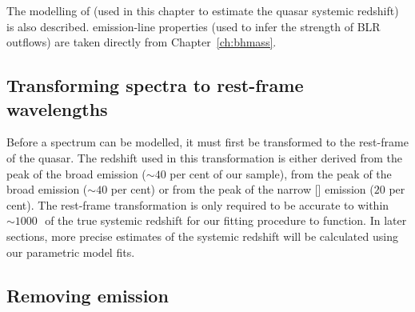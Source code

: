 The modelling of \ha (used in this chapter to estimate the quasar systemic redshift) is also described.
 emission-line properties (used to infer the strength of BLR outflows) are taken directly from Chapter~\ref{ch:bhmass}.

\subsection{Transforming spectra to rest-frame wavelengths}

Before a spectrum can be modelled, it must first be transformed to the rest-frame of the quasar.
The redshift used in this transformation is either derived from the peak of the broad \ha emission ($\sim40$ per cent of our sample), from the peak of the broad \hb emission ($\sim40$ per cent) or from the peak of the narrow [] emission ($20$ per cent).
The rest-frame transformation is only required to be accurate to within $\sim1000$\,\kms\, of the true systemic redshift for our fitting procedure to function.
In later sections, more precise estimates of the systemic redshift will be calculated using our parametric model fits.

\subsection{Removing  emission}
\label{sec:ch4-fe-removal}

